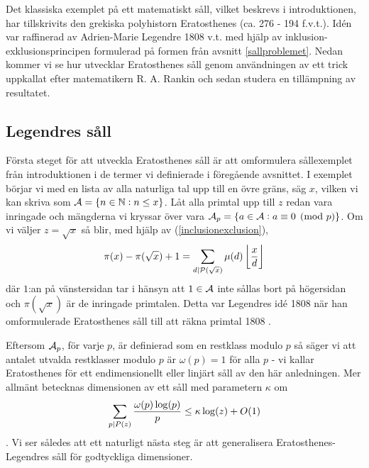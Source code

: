 
Det klassiska exemplet på ett matematiskt såll, vilket beskrevs i introduktionen, har tillskrivits den grekiska polyhistorn Eratosthenes (ca. 276 - 194 f.v.t.). Idén var raffinerad av Adrien-Marie Legendre 1808 v.t. med hjälp av inklusion-exklusionsprincipen formulerad på formen från avsnitt \ref{sallproblemet}. Nedan kommer vi se hur \cite{cojocarumurty} utvecklar Eratosthenes såll genom användningen av ett trick uppkallat efter matematikern R. A. Rankin och sedan studera en tillämpning av resultatet. 

\subsection{Legendres såll}

Första steget för att utveckla Eratosthenes såll är att omformulera sållexemplet från introduktionen i de termer vi definierade i föregående avsnittet. I exemplet börjar vi med en lista av alla naturliga tal upp till en övre gräns, säg $x$, vilken vi kan skriva som $\mathcal{A} = \{n \in \mathbb{N} : n \leq x\}$. Låt alla primtal upp till $z$ redan vara inringade och mängderna vi kryssar över vara \(\mathcal{A}_p = \{a \in \mathcal{A} :  a \equiv 0 \pmod{p}\}\). Om vi väljer $z = \sqrt{x}$ så blir, med hjälp av (\ref{inclusionexclusion}),
\begin{align*}
    \pi(x) - \pi(\sqrt{x}) + 1 = \sum_{d \mid \mathcal{P}(\sqrt{x})} \mu(d) \left\lfloor \frac{x}{d} \right\rfloor  
\end{align*}
där \(1\):an på vänstersidan tar i hänsyn att \(1 \in \mathcal{A}\) inte sållas bort på högersidan och \(\pi(\sqrt{x})\) är de inringade primtalen. Detta var Legendres idé 1808 när han omformulerade Eratosthenes såll till att räkna primtal 1808 \cite{opera}. 

Eftersom \(\mathcal{A}_p\), för varje $p$, är definierad som en restklass modulo $p$ så säger vi att antalet utvalda restklasser modulo $p$ är $\omega(p) = 1$ för alla $p$ - vi kallar Eratosthenes för ett endimensionellt eller linjärt såll av den här anledningen. Mer allmänt betecknas dimensionen av ett såll med parametern \(\kappa\) om 
\begin{align} \label{dimension}
    \sum_{p \mid P(z)} \frac{\omega(p) \log(p)}{p} \leq \kappa \log(z) + O(1)
\end{align}
. Vi ser således att ett naturligt nästa steg är att generalisera Eratosthenes-Legendres såll för godtyckliga dimensioner. 


